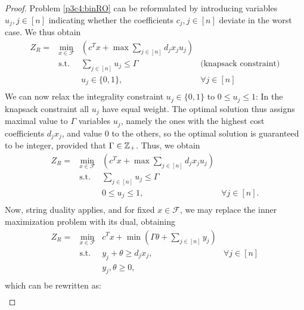 \begin{proof}
Problem \eqref{p3c4:binRO} can be reformulated by introducing variables $u_j,j\in[n]$ indicating whether the coefficients $c_j,j\in[n]$ deviate in the worst case. We thus obtain
\begin{equation}
\begin{array}{rlll}
 Z_R = &\min\limits_ {x\in \mathcal{F}}&\left(c^Tx+\max\sum\limits_{j\in [n]}d_jx_ju_j\right) & \\
 					&\text{s.t. } &  \sum\limits_{j\in [n]}u_j\leq\Gamma & \text{(knapsack constraint)}\\
 							&  & u_j\in \{0,1\}, & \forall j\in [n] \\
\end{array}
\end{equation}
We can now relax the integrality constraint $u_j\in\{0,1\}$ to $0\leq u_j\leq 1$: In the knapsack constraint all $u_j$ have equal weight. The optimal solution thus assigns maximal value to $\Gamma$ variables $u_j$, namely the ones with the highest cost coefficients $d_jx_j$, and value $0$ to the others, so the optimal solution is guaranteed to be integer, provided that $\Gamma\in\mathbb{Z}_+$. Thus, we obtain
\begin{equation}
\begin{array}{rlll}
 Z_R = &\min\limits_ {x\in \mathcal{F}}&\left(c^Tx+\max\sum\limits_{j\in [n]}d_jx_ju_j\right) & \\
 					&\text{s.t. } &  \sum\limits_{j\in [n]}u_j\leq\Gamma & \\
		&  &0\leq u_j\leq 1, &\forall  j\in [n]. \\
\end{array}
\end{equation}
Now, string duality applies, and for fixed $x\in\mathcal{F}$, we may replace the inner maximization problem with its dual, obtaining
\begin{equation}
\begin{array}{rlll}
 Z_R = &\min\limits_{x\in \mathcal{F}}&c^Tx+\min\left(\Gamma\theta+\sum\limits_{j\in [n]}y_j\right) & \\
 					&\text{s.t. } & y_j+\theta\geq d_jx_j, & \forall j\in [n] \\
		&  & y_j,\theta\geq 0, & \\
\end{array}
\end{equation}
which can be rewritten as:
\begin{equation}\label{EQ:17}
\begin{array}{rlll}

\end{array}
\end{equation}
\end{proof}

